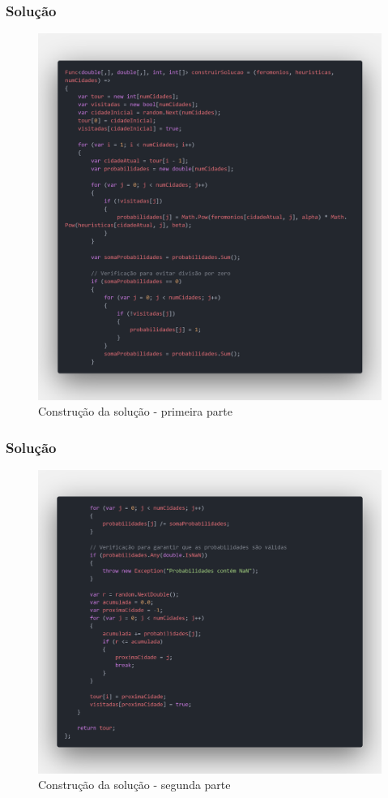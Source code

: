 \documentclass{beamer}
\begin{document}
	\begin{frame}
		\frametitle{Solução}
		\begin{figure}
			\centering
			\includegraphics[width=.6\linewidth]{code 1.png} %
			\caption{Construção da solução - primeira parte}
		\end{figure}
	\end{frame}
	
	\begin{frame}
		\frametitle{Solução}
		\begin{figure}
			\centering
			\includegraphics[width=.7\linewidth]{code 2.png} %
			\caption{Construção da solução - segunda parte}
		\end{figure}
	\end{frame}
	
\end{document}
